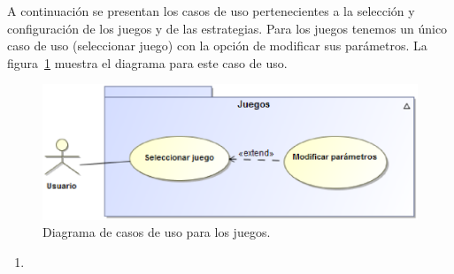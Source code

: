 A continuación se presentan los casos de uso pertenecientes a la selección y configuración de los juegos y de las estrategias.
Para los juegos tenemos un único caso de uso (seleccionar juego) con la opción de modificar sus parámetros. La figura~\ref{fig:casos_uso_juegos} muestra el diagrama para este caso de uso.

\begin{figure}[b]
	\centering
	\includegraphics[scale=0.5]{contenido/cap5/imagenes/seleccionarJuego.eps}
	\caption{Diagrama de casos de uso para los juegos.}
	\label{fig:casos_uso_juegos}
\end{figure}

\begin{enumerate}[resume]
	\item {}
\end{enumerate}

